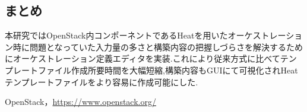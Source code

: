 \documentclass[a4j]{jarticle}
\begin{document}
\begin{Abstract}
 \section{まとめ}
 本研究ではOpenStack内コンポーネントであるHeatを用いたオーケストレーション時に問題となっていた入力量の多さと構築内容の把握しづらさを解決するためにオーケストレーション定義エディタを実装.これにより従来方式に比べてテンプレートファイル作成所要時間を大幅短縮,構築内容もGUIにて可視化されHeatテンプレートファイルをより容易に作成可能にした.
 
\begin{thebibliography}{99}
  OpenStack，\url{https://www.openstack.org/}
\end{thebibliography}

\end{Abstract}
\end{document}
